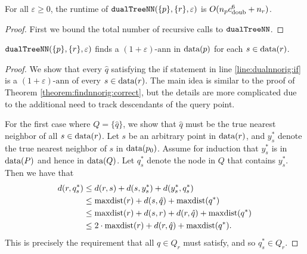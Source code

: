 \documentclass[thesis.tex]{subfiles}
\newcommand{\dist}[2]{\distf({#1},{#2})}
\newcommand{\distf}{d}
\newcommand{\cdoub}{c_\textnormal{doub}}
\newcommand{\eann}{(1+\varepsilon)\text{-ann}}
\newcommand{\mkfunction}[1]{\ifmmode{\textnormal{{#1}}}}
\newcommand{\maxdist}[1]    {\mkfunction{maxdist}({#1})}
\newcommand{\data}[1]       {\mkfunction{data}({#1})}
\newcommand{\dualnn}{\ensuremath{\textnormal{\ttfamily dualTreeNN}}}
\begin{document}
{\begin{theorem}
    For all $\varepsilon \ge 0$,
    the runtime of $\dualnn(\{p\}, \{r\}, \varepsilon)$ is $O(n_p\cdoub^6+n_r)$.
\end{theorem}
\begin{proof}
    First we bound the total number of recursive calls to $\dualnn$. 

\end{proof}

\begin{theorem}
    $\dualnn(\{p\},\{r\},\varepsilon)$ finds a $\eann$ in $\data{p}$ for each $s\in\data{r}$.
\end{theorem}
\begin{proof}
    We show that every $\hat q$ satisfying the if statement in line \ref{line:dualnnorig:if} is a $\eann$ of every $s\in\data{r}$.
    The main idea is similar to the proof of Theorem \ref{theorem:findnnorig:correct},
    but the details are more complicated due to the additional need to track descendants of the query point.

    For the first case where $Q=\{\hat q\}$, 
    we show that $\hat q$ must be the true nearest neighbor of all $s\in\data{r}$.
    Let $s$ be an arbitrary point in $\data r$,
    and $y^*_s$ denote the true nearest neighbor of $s$ in $\data{p_0}$.
    Assume for induction that $y^*_s$ is in $\data{P}$ and hence in $\data{Q}$.
    Let $q^*_s$ denote the node in $Q$ that contains $y^*_s$.
    Then we have that
    \begin{align}
        \dist{r}{q^*_s}
        &\le \dist{r}{s} + \dist{s}{y^*_s} + \dist{y^*_s}{q^*_s}
        \\&\le \maxdist{r} + \dist{s}{\hat q} + \maxdist{q^*}
        \\&\le \maxdist{r} + \dist{s}{r} + \dist{r}{\hat q} + \maxdist{q^*}
        \\&\le 2\cdot\maxdist{r} + \dist{r}{\hat q} + \maxdist{q^*}
        .
    \end{align}
    This is precisely the requirement that all $q\in Q_r$ must satisfy,
    and so $q^*_s \in Q_r$.


\end{proof}}
\end{document}
